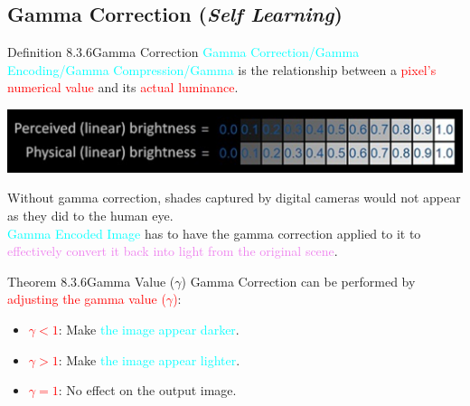 \documentclass{book}
\begin{document}
\subsection{Gamma Correction (\textit{Self Learning})}
\begin{defBox}{Definition 8.3.6}{Gamma Correction}
    \textcolor{cyan}{Gamma Correction/Gamma Encoding/Gamma Compression/Gamma} is the relationship between a \textcolor{red}{pixel's numerical value} and its \textcolor{red}{actual luminance}.
    \begin{center}
        \includegraphics[scale=0.2]{chapter 8/gamma_figure.jpeg}
    \end{center}
\end{defBox}
Without gamma correction, shades captured by digital cameras would not appear as they did to the human eye.\\
\textcolor{cyan}{Gamma Encoded Image} has to have the gamma correction applied to it to \textcolor{violet}{effectively convert it back into light from the original scene}.\\
\begin{thmBox}{Theorem 8.3.6}{Gamma Value ($\gamma$)}
    Gamma Correction can be performed by \textcolor{red}{adjusting the gamma value ($\gamma$)}:
    \begin{itemize}
        \item \textcolor{red}{\(\gamma < 1\)}: Make \textcolor{cyan}{the image appear darker}.
        \item \textcolor{red}{\(\gamma > 1\)}: Make \textcolor{cyan}{the image appear lighter}.
        \item \textcolor{red}{\(\gamma = 1\)}: No effect on the output image.
    \end{itemize}
\end{thmBox}
\end{document}
